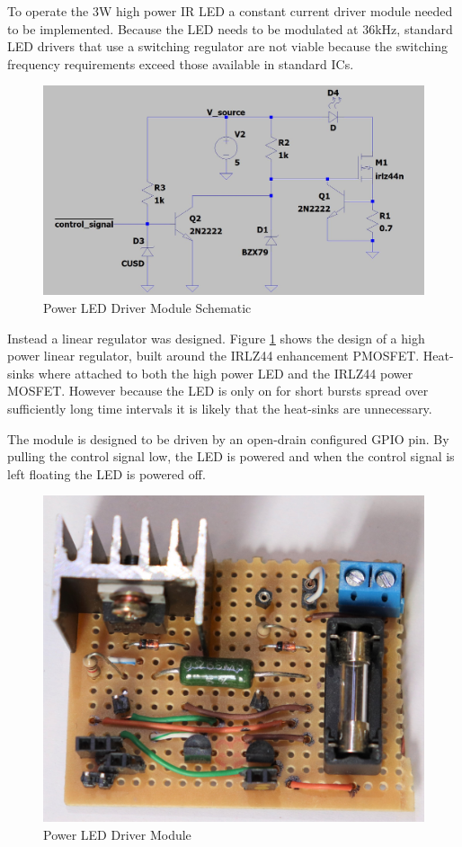To operate the 3W high power IR LED a constant current driver module needed to be implemented. Because the LED needs to be modulated at 36kHz, standard LED drivers that use a switching regulator are not viable because the switching frequency requirements exceed those available in standard ICs.

\begin{figure}[H]
	\centering
	\includegraphics[width=.8\textwidth]{figures/design/power_led_driver.JPG}
	\caption{Power LED Driver Module Schematic}
	\label{fig:schematic_power_led_driver}
\end{figure}

Instead a linear regulator was designed. Figure \ref{fig:schematic_power_led_driver} shows the design of a high power linear regulator, built around the IRLZ44 enhancement PMOSFET. Heat-sinks where attached to both the high power LED and the IRLZ44 power MOSFET. However because the LED is only on for short bursts spread over sufficiently long time intervals it is likely that the heat-sinks are unnecessary.

The module is designed to be driven by an open-drain configured GPIO pin. By pulling the control signal low, the LED is powered and when the control signal is left floating the LED is powered off.

\begin{figure}[H]
	\centering
	\includegraphics[width=.6\textwidth]{figures/modules/power_led_driver.jpg}
	\caption{Power LED Driver Module}
	\label{fig:module_power_led_driver}
\end{figure}


